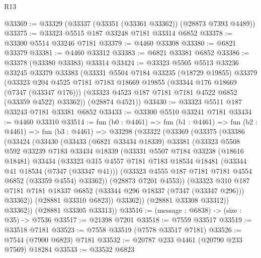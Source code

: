 \begin{lexlean}{R13}
\begin{coremodule}
@33369 := @33329 (@33337 (@33351 (@33361 @33362)) (@28873 @7393 @4489))
@33375 := @33323 @5515 @187 @33248 @7181 @33314 @6852
@33378 := @33300 @5514 @33246 @7181
@33379 := @4460 @33308
@33380 := @6821 @33379
@33381 := @4460 @33312
@33383 := @6821 @33381 @6852
@33386 := @33378 (@33380 @33383) @33314
@33424 := @33323
    @5505
    @5513
    @33236
    @33245
    @33379
    @33383
    (@33331
      @5504
      @7184
      @33235
      (@18729 @19855)
      @33379
      (@33323
        @204
        @4525
        @7181
        @7183
        @18669
        @19855
        (@33344 @176 @18669 (@7347 (@33347 @176)))
        (@33323 @4523 @187 @7181 @7181 @4522 @6852 (@33359 @4522) @33362))
      (@28874 @4521))
@33430 := @33323 @5511 @187 @33243 @7181 @33381 @6852
@33433 := @33300 @5510 @33241 @7181
@33434 := @4460 @33310
@33514 := fun (b0 : @4461) =>
  fun (b1 : @4461) =>
  fun (b2 : @4461) =>
  fun (b3 : @4461) =>
  @33298
    (@33322
      (@33369
        (@33375
          (@33386
            (@33424
              (@33430
                (@33433
                  (@6821 @33434 @18339)
                  @33381
                  (@33323
                    @5508
                    @592
                    @33239
                    @7183
                    @33434
                    @18339
                    (@33331
                      @5507
                      @7184
                      @33238
                      (@18616 @18481)
                      @33434
                      (@33323
                        @315
                        @4557
                        @7181
                        @7183
                        @18534
                        @18481
                        (@33344 @41 @18534 (@7347 (@33347 @41)))
                        (@33323 @4555 @187 @7181 @7181 @4554 @6852 (@33359 @4554) @33362))
                      (@28873 @7201 @4553))
                    (@33323
                      @310
                      @187
                      @7181
                      @7181
                      @18337
                      @6852
                      (@33344 @296 @18337 (@7347 (@33347 @296)))
                      @33362))
                  (@28881 @33310 @6823))
                @33362))
            (@28881 @33308 @33312))
          @33362))
      (@28881 @33305 @33313))
@33516 := (message : @6838) -> (size : @35) -> @7536
@33517 := @21398 @7201
@33518 := @7559 @33517
@33519 := @33518 @7181
@33523 := @7558 @33519 (@7578 @33517 @7181)
@33526 := @7544 (@7900 @6823) @7181
@33532 := @20787 @233 @4461 (@20790 @233 @7569) @18284
@33533 := @33532 @6823

\end{coremodule}
\end{lexlean}
